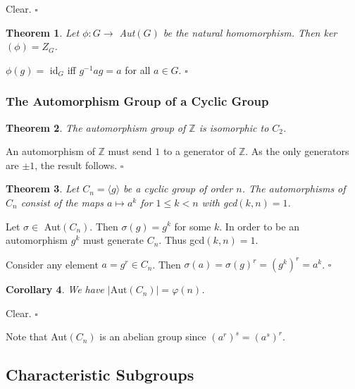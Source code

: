 \documentclass[10pt]{article}
\newtheorem{theorem}{Theorem}[section]
\newtheorem{corollary}[theorem]{Corollary}
\newenvironment{proof}[1][Proof]{\begin{trivlist}
\item[\hskip \labelsep {\itshape #1}]}{\end{trivlist}}
\begin{document}
\begin{proof}
Clear. $\square$
\end{proof}

\begin{theorem}
Let $\phi : G \to$ Aut$(G)$ be the natural homomorphism. Then ker$(\phi) = Z_G$.
\end{theorem}

\begin{proof}
$\phi(g) =$ id$_G$ iff $g^{-1}ag = a$ for all $a \in G$. $\square$
\end{proof}

\subsubsection{The Automorphism Group of a Cyclic Group}

\begin{theorem}
The automorphism group of $\mathbb{Z}$ is isomorphic to $C_2$.
\end{theorem}

\begin{proof}
An automorphism of $\mathbb{Z}$ must send $1$ to a generator of $\mathbb{Z}$. As the only generators are $\pm 1$, the result follows. $\square$
\end{proof}

\begin{theorem}
Let $C_n = \langle g \rangle$ be a cyclic group of order $n$. The automorphisms of $C_n$ consist of the maps $a \mapsto a^k$ for $1 \leq k < n$ with gcd$(k, n) = 1$.
\end{theorem}

\begin{proof}
Let $\sigma \in$ Aut$(C_n)$. Then $\sigma(g) = g^k$ for some $k$. In order to be an automorphism $g^k$ must generate $C_n$. Thus gcd$(k, n) = 1$.

Consider any element $a = g^r \in C_n$. Then $\sigma(a) = \sigma(g)^r = (g^k)^r = a^k$. $\square$
\end{proof}

\begin{corollary}
We have $|\mbox{Aut}(C_n)| = \varphi(n)$.
\end{corollary}

\begin{proof}
Clear. $\square$
\end{proof}

Note that Aut$(C_n)$ is an abelian group since $(a^r)^s = (a^s)^r$.

\subsection{Characteristic Subgroups}
\end{document}
